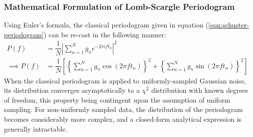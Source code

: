    		\subsubsection{Mathematical Formulation of Lomb-Scargle Periodogram}
    			Using Euler's formula, the classical periodogram given in equation (\ref{eqn:schuster-periodogram}) can be re-cast in the following manner:
    			\begin{align}
    				P(f)&=\dfrac{1}{N}\left| \sum_{n=1}^{N}{g_ne^{-2\pi i ft_n}} \right|^2 \nonumber \\
    				\implies P(f)&=\dfrac{1}{N}\left[ \left\lbrace \sum_{n=1}^{N}{g_n\cos{(2\pi ft_n)}} \right\rbrace^2 + \left\lbrace \sum_{n=1}^{N}{g_n\sin{(2\pi ft_n)}} \right\rbrace^2 \right] \label{eqn:lomb-scargle-01}
    			\end{align}
    			When the classical periodogram is applied to uniformly-sampled Gaussian noise, its distribution converges asymptotically to a $\chi^2$ distribution with known degrees of freedom, this property being contingent upon the assumption of uniform sampling. For non-uniformly sampled data, the distribution of the periodogram becomes considerably more complex, and a closed-form analytical expression is generally intractable.
    			
